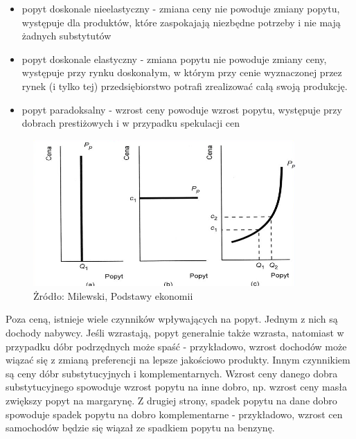 \documentclass[12pt]{extarticle}
\begin{document}
\begin{itemize}
	\item popyt doskonale nieelastyczny - zmiana ceny nie powoduje zmiany popytu, występuje dla produktów, które zaspokajają niezbędne potrzeby i nie mają żadnych substytutów
    \item popyt doskonale elastyczny - zmiana popytu nie powoduje zmiany ceny, występuje przy rynku doskonałym, w którym przy cenie wyznaczonej przez rynek (i tylko tej) przedsiębiorstwo potrafi zrealizować całą swoją produkcję.
    \item popyt paradoksalny - wzrost ceny powoduje wzrost popytu, występuje przy dobrach prestiżowych i w przypadku spekulacji cen
\end{itemize}

\begin{figure}[H]
\centering
\includegraphics[width=10cm]{popyt_nietypowy}
    \caption{Żródło: Milewski, Podstawy ekonomii}
\end{figure}


Poza ceną, istnieje wiele czynników wpływających na popyt. Jednym z nich są dochody nabywcy. Jeśli wzrastają, popyt generalnie także wzrasta, natomiast w przypadku dóbr podrzędnych może spaść - przykładowo, wzrost dochodów może wiązać się z zmianą preferencji na lepsze jakościowo produkty. Innym czynnikiem są ceny dóbr substytucyjnych i komplementarnych. Wzrost ceny danego dobra substytucyjnego spowoduje wzrost popytu na inne dobro, np. wzrost ceny masła zwiększy popyt na margarynę. Z drugiej strony, spadek popytu na dane dobro spowoduje spadek popytu na dobro komplementarne - przykładowo, wzrost cen samochodów będzie się wiązał ze spadkiem popytu na benzynę.
\end{document}
